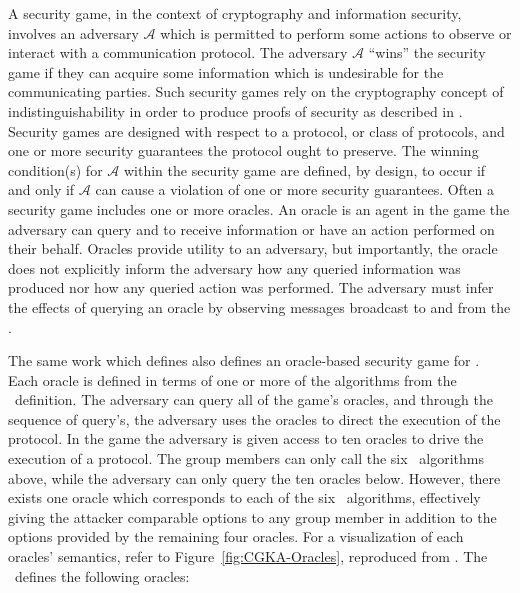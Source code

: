 A security game, in the context of cryptography and information security, involves an adversary \(\mathcal{A}\) which is permitted to perform some actions to observe or interact with a communication protocol.
The adversary \(\mathcal{A}\) ``wins'' the security game if they can acquire some information which is undesirable for the communicating parties.
Such security games rely on the cryptography concept of indistinguishability in order to produce proofs of security as described in \autocite{Maurer2007}.
Security games are designed with respect to a protocol, or class of protocols, and one or more security guarantees the protocol ought to preserve.
The winning condition(s) for \(\mathcal{A}\) within the security game are defined, by design, to occur if and only if \(\mathcal{A}\) can cause a violation of one or more security guarantees.
Often a security game includes one or more oracles.
An oracle is an agent in the game the adversary can query and to receive information or have an action performed on their behalf.
Oracles provide utility to an adversary, but importantly, the oracle does not explicitly inform the adversary how any queried information was produced nor how any queried action was performed.
The adversary must infer the effects of querying an oracle by observing messages broadcast to and from the .

The same work which defines  also defines an oracle-based security game for .
Each oracle is defined in terms of one or more of the algorithms from the \CGKAdef\ definition.
The adversary can query all of the game's oracles, and through the sequence of query's, the adversary uses the oracles to direct the execution of the  protocol.
In the game the adversary is given access to ten oracles to drive the execution of a  protocol.
The group members can only call the six \CGKAdef\ algorithms above, while the adversary can only query the ten oracles below.
However, there exists one oracle which corresponds to each of the six \CGKAdef\ algorithms, effectively giving the attacker comparable options to any group member in addition to the options provided by the remaining four oracles.
For a visualization of each oracles' semantics, refer to Figure\ \ref{fig:CGKA-Oracles}, reproduced from \autocite{alwen2020security}.
The \CGKAsec\ defines the following oracles:

